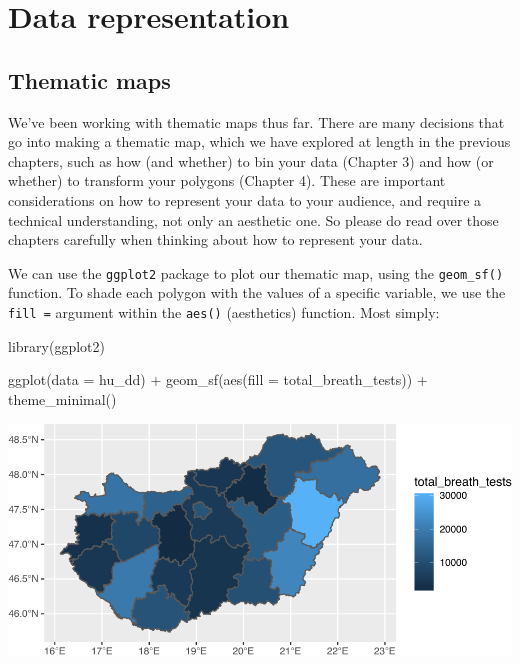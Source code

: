 \documentclass[
]{book}
\newenvironment{Shaded}{\begin{snugshade}}{\end{snugshade}}
\newcommand{\AttributeTok}[1]{\textcolor[rgb]{0.77,0.63,0.00}{#1}}
\newcommand{\FunctionTok}[1]{\textcolor[rgb]{0.00,0.00,0.00}{#1}}
\newcommand{\NormalTok}[1]{#1}
\newcommand{\SpecialCharTok}[1]{\textcolor[rgb]{0.00,0.00,0.00}{#1}}
\begin{document}
\hypertarget{data-representation}{%
\section{Data representation}\label{data-representation}}

\hypertarget{thematic-maps}{%
\subsection{Thematic maps}\label{thematic-maps}}

We've been working with thematic maps thus far. There are many decisions that go into making a thematic map, which we have explored at length in the previous chapters, such as how (and whether) to bin your data (Chapter 3) and how (or whether) to transform your polygons (Chapter 4). These are important considerations on how to represent your data to your audience, and require a technical understanding, not only an aesthetic one. So please do read over those chapters carefully when thinking about how to represent your data.

We can use the \texttt{ggplot2} package to plot our thematic map, using the \texttt{geom\_sf()} function. To shade each polygon with the values of a specific variable, we use the \texttt{fill\ =} argument within the \texttt{aes()} (aesthetics) function. Most simply:

\begin{Shaded}
\begin{Highlighting}[]
\FunctionTok{library}\NormalTok{(ggplot2)}

\FunctionTok{ggplot}\NormalTok{(}\AttributeTok{data =}\NormalTok{ hu\_dd) }\SpecialCharTok{+} 
  \FunctionTok{geom\_sf}\NormalTok{(}\FunctionTok{aes}\NormalTok{(}\AttributeTok{fill =}\NormalTok{ total\_breath\_tests)) }\SpecialCharTok{+} 
  \FunctionTok{theme\_minimal}\NormalTok{()}
\end{Highlighting}
\end{Shaded}

\includegraphics{crime_mapping_files/figure-latex/themmap-1.pdf}
\end{document}
